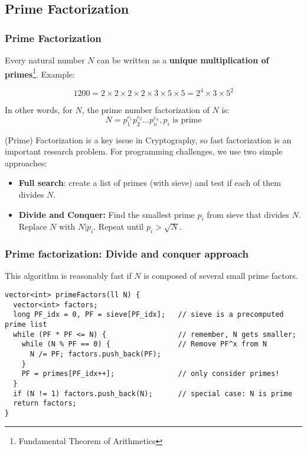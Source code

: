 \subsection{Prime Factorization}
\begin{frame}
  \frametitle{Prime Factorization}

  Every natural number $N$ can be written as a {\bf unique multiplication of primes}\footnote{Fundamental Theorem of Arithmetics}. Example:

  \begin{equation*}
    1200 = 2\times2\times2\times2\times3\times5\times5 = 2^4\times3\times5^2
  \end{equation*}

  In other words, for $N$, the prime number factorization of $N$ is:
    \begin{equation*}
      N=p_1^{e_1}p_2^{e_2}\ldots p_n^{e_n}, p_i \text{ is prime}
    \end{equation*}

  (Prime) Factorization is a key issue in Cryptography, so fast factorization is an important research problem. For programming challenges, we use two simple approaches:\bigskip

  \begin{itemize}
    \item {\bf Full search}: create a list of primes (with sieve) and test if each of them divides $N$.
    \item {\bf Divide and Conquer:} Find the smallest prime $p_i$ from sieve that divides $N$. Replace $N$ with $N|p_i$. Repeat until $p_i > \sqrt{N}$.
  \end{itemize}
\end{frame}

\begin{frame}[fragile]
  \frametitle{Prime factorization: Divide and conquer approach}

  This algorithm is reasonably fast if $N$ is composed of several small prime factors.

  {\smaller
  \begin{exampleblock}{}
\begin{verbatim}
vector<int> primeFactors(ll N) {
  vector<int> factors;
  long PF_idx = 0, PF = sieve[PF_idx];   // sieve is a precomputed prime list
  while (PF * PF <= N) {                 // remember, N gets smaller;
    while (N % PF == 0) {                // Remove PF^x from N
      N /= PF; factors.push_back(PF);
    }
    PF = primes[PF_idx++];               // only consider primes!
  }
  if (N != 1) factors.push_back(N);      // special case: N is prime
  return factors;
}
\end{verbatim}
  \end{exampleblock}}
\end{frame}

